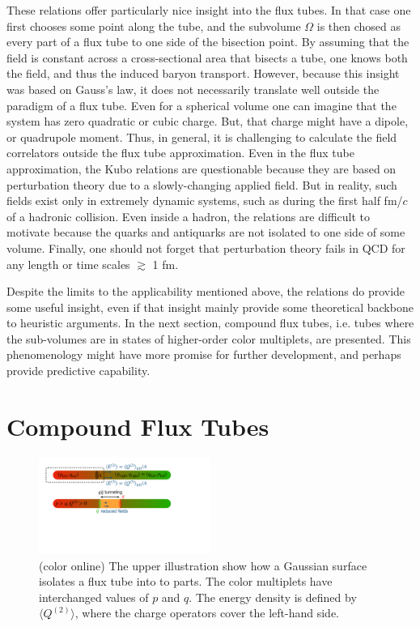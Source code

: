 \documentclass[aps, prc, 12pt, nofootinbib, showpacs, superscriptaddress, tightenlines, groupedaddress]{revtex4-2}
\begin{document}
These relations offer particularly nice insight into the flux tubes. In that case one first chooses some point along the tube, and the subvolume $\Omega$ is then chosed as every part of a flux tube to one side of the bisection point. By assuming that the field is constant across a cross-sectional area that bisects a tube, one knows both the field, and thus the induced baryon transport. However, because this insight was based on Gauss's law, it does not necessarily translate well outside the paradigm of a flux tube. Even for a spherical volume one can imagine that the system has zero quadratic or cubic charge. But, that charge might have a dipole, or quadrupole moment. Thus, in general, it is challenging to calculate the field correlators outside the flux tube approximation. Even in the flux tube approximation, the Kubo relations are questionable because they are based on perturbation theory due to a slowly-changing applied field. But in reality, such fields exist only in extremely dynamic systems, such as during the first half fm/$c$ of a hadronic collision. Even inside a hadron, the relations are difficult to motivate because the quarks and antiquarks are not isolated to one side of some volume. Finally, one should not forget that perturbation theory fails in QCD for any length or time scales $\gtrsim$ 1 fm.

Despite the limits to the applicability mentioned above, the relations do provide some useful insight, even if that insight mainly provide some theoretical backbone to heuristic arguments. In the next section, compound flux tubes, i.e. tubes where the sub-volumes are in states of higher-order color multiplets, are presented. This phenomenology might have more promise for further development, and perhaps provide predictive capability.

\section{Compound Flux Tubes}\label{sec:compound}
\begin{figure}
\centerline{\includegraphics[width=0.5\textwidth]{figs/compoundtube.pdf}}
\caption{\label{fig:compoundtube}(color online)
The upper illustration show how a Gaussian surface isolates a flux tube into to parts. The color multiplets have interchanged values of $p$ and $q$. The energy density is defined by $\langle Q^{(2)}\rangle$, where the charge operators cover the left-hand side. 
}
\end{figure}
\end{document}
